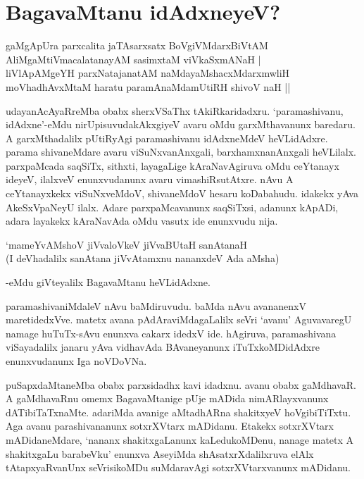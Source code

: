 \chapter{BagavaMtanu idAdxneyeV?}\label{chap8}

\begin{shloka}
gaMgApUra parxcalita jaTAsarxsatx BoVgiVMdarxBiVtAM\\
AliMgaMtiVmacalatanayAM sasimxtaM viVkaSxmANaH |\\
liVlApAMgeYH parxNatajanatAM naMdayaMshacxMdarxmwliH\\
moVhadhAvxMtaM haratu paramAnaMdamUtiRH shivoV naH‌ ||
\end{shloka}

udayanAcAyaRreMba obabx sherxVSaThx tAkiRkaridadxru. `paramashivanu, idAdxne'-eMdu nirUpisuvudakAkxgiyeV avaru oMdu garxMthavanunx baredaru. A garxMthadalilx pUtiRyAgi paramashivanu idAdxneMdeV heVLidAdxre. parama shivaneMdare avaru viSuNxvanAnxgali, barxhamxnanAnxgali heVLilalx. parxpaMcada saqSiTx, sithxti, layagaLige kAraNavAgiruva oMdu ceYtanayx ideyeV, ilalxveV enunxvudanunx avaru vimashiRsutAtxre. nAvu A ceYtanayxkekx viSuNxveMdoV, shivaneMdoV hesaru koDabahudu. idakekx yAva AkeSxVpaNeyU ilalx. Adare parxpaMcavanunx saqSiTxsi, adanunx kApADi, adara layakekx kAraNavAda oMdu vasutx ide enunxvudu nija.

\begin{shloka}
`mameYvAMshoV jiVvaloVkeV jiVvaBUtaH sanAtanaH\\
(I deVhadalilx sanAtana jiVvAtamxnu nananxdeV Ada aMsha)
\end{shloka}

-eMdu giVteyalilx BagavaMtanu heVLidAdxne.

paramashivaniMdaleV nAvu baMdiruvudu. baMda nAvu avananenxV maretidedxVve. matetx avana pAdAraviMdagaLalilx seVri `avanu' AguvavaregU namage huTuTx-sAvu enunxva cakarx idedxV ide. hAgiruva, paramashivana viSayadalilx janaru yAva vidhavAda BAvaneyanunx iTuTxkoMDidAdxre enunxvudanunx Iga noVDoVNa.

puSapxdaMtaneMba obabx parxsidadhx kavi idadxnu. avanu obabx gaMdhavaR. A gaMdhavaRnu omemx BagavaMtanige pUje mADida nimARlayxvanunx dATibiTaTxnaMte. adariMda avanige aMtadhARna shakitxyeV hoVgibiTiTxtu. Aga avanu parashivananunx sotxrXVtarx mADidanu. Etakekx sotxrXVtarx mADidaneMdare, `nananx shakitxgaLanunx kaLedukoMDenu, nanage matetx A shakitxgaLu barabeVku' enunxva AseyiMda shAsatxrXdalilxruva elAlx tAtapxyaRvanUnx seVrisikoMDu suMdaravAgi sotxrXVtarxvanunx mADidanu.

